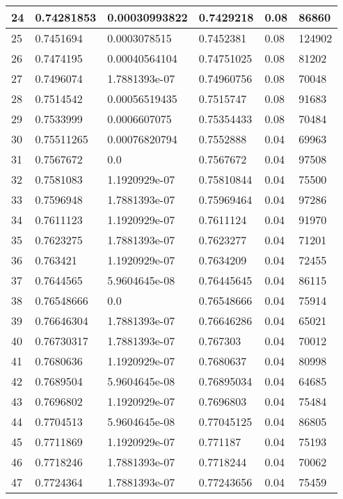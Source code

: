 \begin{longtable}{|l|l|l|l|l|l|}
24 & 0.74281853 & 0.00030993822 & 0.7429218 & 0.08 & 86860 \\ \hline 
25 & 0.7451694 & 0.0003078515 & 0.7452381 & 0.08 & 124902 \\ \hline 
26 & 0.7474195 & 0.00040564104 & 0.74751025 & 0.08 & 81202 \\ \hline 
27 & 0.7496074 & 1.7881393e-07 & 0.74960756 & 0.08 & 70048 \\ \hline 
28 & 0.7514542 & 0.00056519435 & 0.7515747 & 0.08 & 91683 \\ \hline 
29 & 0.7533999 & 0.0006607075 & 0.75354433 & 0.08 & 70484 \\ \hline 
30 & 0.75511265 & 0.00076820794 & 0.7552888 & 0.04 & 69963 \\ \hline 
31 & 0.7567672 & 0.0 & 0.7567672 & 0.04 & 97508 \\ \hline 
32 & 0.7581083 & 1.1920929e-07 & 0.75810844 & 0.04 & 75500 \\ \hline 
33 & 0.7596948 & 1.7881393e-07 & 0.75969464 & 0.04 & 97286 \\ \hline 
34 & 0.7611123 & 1.1920929e-07 & 0.7611124 & 0.04 & 91970 \\ \hline 
35 & 0.7623275 & 1.7881393e-07 & 0.7623277 & 0.04 & 71201 \\ \hline 
36 & 0.763421 & 1.1920929e-07 & 0.7634209 & 0.04 & 72455 \\ \hline 
37 & 0.7644565 & 5.9604645e-08 & 0.76445645 & 0.04 & 86115 \\ \hline 
38 & 0.76548666 & 0.0 & 0.76548666 & 0.04 & 75914 \\ \hline 
39 & 0.76646304 & 1.7881393e-07 & 0.76646286 & 0.04 & 65021 \\ \hline 
40 & 0.76730317 & 1.7881393e-07 & 0.767303 & 0.04 & 70012 \\ \hline 
41 & 0.7680636 & 1.1920929e-07 & 0.7680637 & 0.04 & 80998 \\ \hline 
42 & 0.7689504 & 5.9604645e-08 & 0.76895034 & 0.04 & 64685 \\ \hline 
43 & 0.7696802 & 1.1920929e-07 & 0.7696803 & 0.04 & 75484 \\ \hline 
44 & 0.7704513 & 5.9604645e-08 & 0.77045125 & 0.04 & 86805 \\ \hline 
45 & 0.7711869 & 1.1920929e-07 & 0.771187 & 0.04 & 75193 \\ \hline 
46 & 0.7718246 & 1.7881393e-07 & 0.7718244 & 0.04 & 70062 \\ \hline 
47 & 0.7724364 & 1.7881393e-07 & 0.77243656 & 0.04 & 75459 \\ \hline 

\end{longtable}
